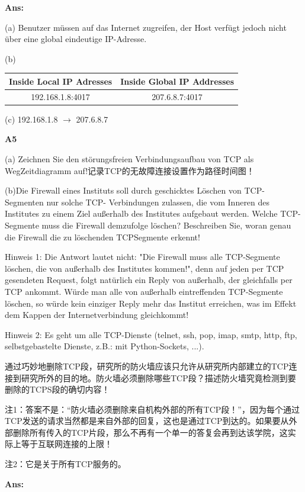 \documentclass[fleqn]{article}
\begin{document}
\textbf{Ans:}

(a) Benutzer müssen auf das Internet zugreifen, der Host verfügt jedoch nicht über eine global eindeutige IP-Adresse.

(b) \begin{tabular}{|c|c|}
    \hline
    Inside Local IP Adresses & Inside Global IP Addresses\\
    \hline
    192.168.1.8:4017&207.6.8.7:4017\\
    \hline
\end{tabular}

(c) 192.168.1.8 $\rightarrow$ 207.6.8.7

\noindent\textbf{A5} 

(a) Zeichnen Sie den störungsfreien Verbindungsaufbau von TCP als WegZeitdiagramm auf!记录TCP的无故障连接设置作为路径时间图！

(b)Die Firewall eines Instituts soll durch geschicktes Löschen von TCP-Segmenten nur solche TCP- Verbindungen zulassen, die vom Inneren des Institutes zu einem Ziel außerhalb des Institutes aufgebaut werden. Welche TCP-Segmente muss die Firewall demzufolge löschen? Beschreiben Sie, woran genau die Firewall die zu löschenden TCPSegmente erkennt!

Hinweis 1: Die Antwort lautet nicht: "Die Firewall muss alle TCP-Segmente löschen, die von außerhalb des Institutes kommen!", denn auf jeden per TCP gesendeten Request, folgt natürlich ein Reply von außerhalb, der gleichfalls per TCP ankommt. Würde man alle von außerhalb eintreffenden TCP-Segmente löschen, so würde kein einziger Reply mehr das Institut erreichen, was im Effekt dem Kappen der Internetverbindung gleichkommt!

Hinweis 2: Es geht um alle TCP-Dienste (telnet, ssh, pop, imap, smtp, http, ftp, selbstgebastelte Dienste, z.B.: mit Python-Sockets, ...).

通过巧妙地删除TCP段，研究所的防火墙应该只允许从研究所内部建立的TCP连接到研究所外的目的地。防火墙必须删除哪些TCP段？描述防火墙究竟检测到要删除的TCPS段的确切内容！

注1：答案不是：“防火墙必须删除来自机构外部的所有TCP段！”，因为每个通过TCP发送的请求当然都是来自外部的回复，这也是通过TCP到达的。如果要从外部删除所有传入的TCP片段，那么不再有一个单一的答复会再到达该学院，这实际上等于互联网连接的上限！

注2：它是关于所有TCP服务的。

\textbf{Ans:}
\end{document}
